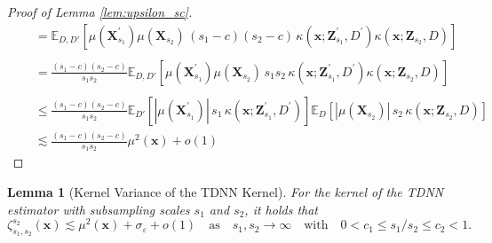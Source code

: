 \documentclass[letterpaper,10pt]{article}
\numberwithin{equation}{section}
\numberwithin{thm}{section}
\newtheorem{lem}{Lemma}
\numberwithin{lem}{section}
\numberwithin{cor}{section}
\newcommand{\E}{\mathbb{E}}
\newcommand{\1}{\mathbbm{1}}
\begin{document}
\begin{proof}[Proof of Lemma \ref{lem:upsilon_sc}]
\begin{equation}
\begin{aligned}
			 & \quad = \E_{D, D'}\left[\mu(\mathbf{X}_{s_1}^{\prime}) \mu(\mathbf{X}_{s_2}) \, (s_1 - c)(s_2 -c) \,\kappa(\mathbf{x}; \mathbf{Z}_{s_1}^{\prime}, D^{\prime}) \kappa(\mathbf{x}; \mathbf{Z}_{s_2}, D)  \right]                        \\                                                                                                                                                                       \\
			 & \quad = \frac{(s_1 - c)(s_2 -c)}{s_1 s_2}\E_{D, D'}\left[\mu(\mathbf{X}_{s_1}^{\prime}) \mu(\mathbf{X}_{s_2}) \, s_1 s_2 \,\kappa(\mathbf{x}; \mathbf{Z}_{s_1}^{\prime}, D^{\prime}) \kappa(\mathbf{x}; \mathbf{Z}_{s_2}, D)  \right] \\                                                                                                                                                                       \\
			 & \quad \leq \frac{(s_1 - c)(s_2 -c)}{s_1 s_2}
			\E_{D'}\left[|\mu(\mathbf{X}_{s_1}^{\prime})| \, s_1 \,\kappa(\mathbf{x}; \mathbf{Z}_{s_1}^{\prime}, D^{\prime})   \right]
			\E_{D}\left[ |\mu(\mathbf{X}_{s_2})| \, s_2 \, \kappa(\mathbf{x}; \mathbf{Z}_{s_2}, D)  \right]                                                                                                                                          \\
			 & \quad \lesssim \frac{(s_1 - c)(s_2 -c)}{s_1 s_2}\mu^2(\mathbf{x}) + o(1)
		\end{aligned}
	\end{equation}
\end{proof}

\newpage
\begin{lem}[Kernel Variance of the TDNN Kernel]\label{lem:Var_TDNN_k}
	For the kernel of the TDNN estimator with subsampling scales $s_1$ and $s_2$, it holds that
	\begin{equation}
		\zeta_{s_1, s_2}^{s_2}\left(\mathbf{x}\right)
		\lesssim \mu^2(\mathbf{x}) + \sigma_{\varepsilon} + o(1)
		\quad \text{as} \quad s_1, s_2 \rightarrow \infty
		\quad \text{with} \quad
		0 < c_1 \leq s_1 / s_2 \leq c_2 < 1.
	\end{equation}
\end{lem}
\end{document}
